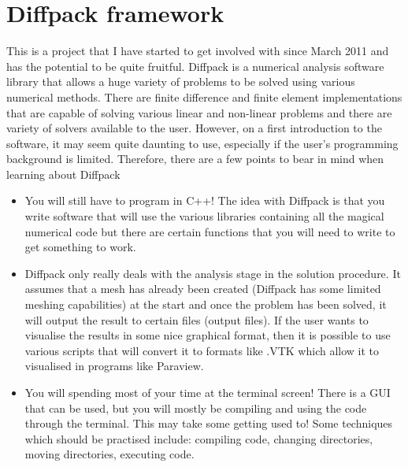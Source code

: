 \chapter{Diffpack framework}

This is a project that I have started to get involved with since March 2011 and has the potential to be quite fruitful. Diffpack is a numerical analysis software library that allows a huge variety of problems to be solved using various numerical methods. There are finite difference and finite element implementations that are capable of solving various linear and non-linear problems and there are variety of solvers available to the user. However, on a first introduction to the software, it may seem quite daunting to use, especially if the user's programming background is limited. Therefore, there are a few points to bear in mind when learning about Diffpack
\begin{itemize}
\item  You will still have to program in C++! The idea with Diffpack is that you write software that will use the various libraries containing all the magical numerical code but there are certain functions that you will need to write to get something to work.
\item Diffpack only really deals with the analysis stage in the solution procedure. It assumes that a mesh has already been created (Diffpack has some limited meshing capabilities) at the start and once the problem has been solved, it will output the result to certain files (output files). If the user wants to visualise the results in some nice graphical format, then it is possible to use various scripts that will convert it to formats like .VTK which allow it to visualised in programs like Paraview. 
\item You will spending most of your time at the terminal screen! There is a GUI that can be used, but you will mostly be compiling and using the code through the terminal. This may take some getting used to! Some techniques which should be practised include: compiling code, changing directories,  moving directories, executing code.
\end{itemize}

